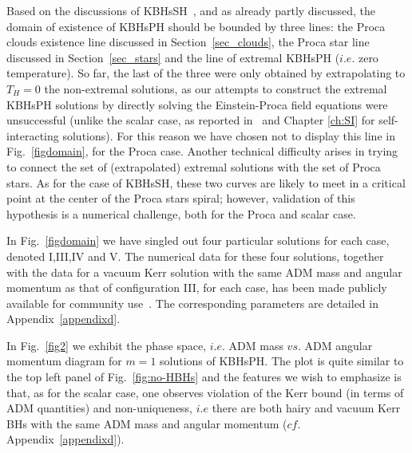 Based on the discussions of KBHsSH~\cite{Herdeiro:2014goa,Herdeiro:2015gia,Herdeiro:2015tia}, and as already partly discussed, the domain of existence of KBHsPH should be bounded by three lines: the Proca clouds existence line discussed in Section~\ref{sec_clouds}, the Proca star line discussed in Section~\ref{sec_stars} and the line of extremal KBHsPH ($i.e.$ zero temperature).
So far, the last of the three were only obtained by extrapolating to $T_H=0$ the non-extremal solutions, as our attempts to construct the extremal KBHsPH solutions by directly solving the Einstein-Proca field equations were unsuccessful (unlike the scalar case, as reported in~\cite{Herdeiro:2015gia} and Chapter \ref{ch:SI} for self-interacting solutions).
For this reason we have chosen not to display this line in Fig.~\ref{figdomain}, for the Proca case.
Another technical difficulty arises in trying to connect the set of (extrapolated) extremal solutions with the set of Proca stars.
As for the case of KBHsSH, these two curves are likely to meet in a critical point at the center of the 
Proca stars spiral; however, validation of this hypothesis is a numerical challenge, both for the Proca and scalar case.

In Fig.~\ref{figdomain} we have singled out four particular solutions for each case, denoted I,III,IV and V. The numerical data for these four solutions, together with the data for a vacuum Kerr solution with the same ADM mass and angular momentum as that of configuration III, for each case, has been made publicly available for community use~\cite{datakbhph,datakbhsh}. The corresponding parameters are detailed in Appendix~\ref{appendixd}.

In Fig.~\ref{fig2} we exhibit the phase space, $i.e.$ ADM mass $vs.$ ADM angular momentum diagram for $m=1$ solutions of KBHsPH.
The plot is quite similar to the top left panel of Fig.~\ref{fig:no-HBHs} and the features we wish to emphasize is that, as for the scalar case, one observes violation of the Kerr bound (in terms of ADM quantities) and non-uniqueness, $i.e$ there are both hairy and vacuum Kerr BHs with the same ADM mass and angular momentum ($cf.$ Appendix~\ref{appendixd}). 


